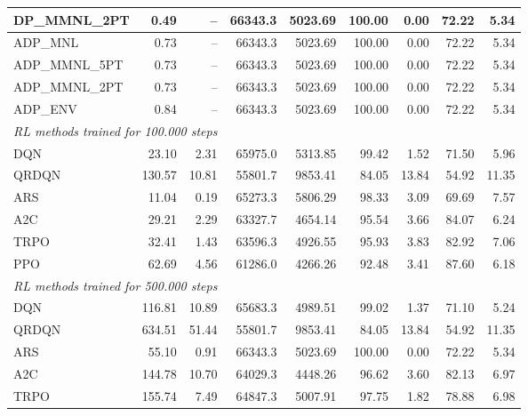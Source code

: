 \begin{samepage}
\begin{center}
\begin{tabular}{l|rr|rr|rr|rr}
    DP\_MMNL\_2PT &     0.49 &    -- &    66343.3 &    5023.69 &  100.00 &    0.00 &   72.22 &    5.34 \\
    \midrule
    ADP\_MNL     &     0.73 &    -- &    66343.3 &    5023.69 &  100.00 &    0.00 &   72.22 &    5.34 \\
    ADP\_MMNL\_5PT &     0.73 &    -- &    66343.3 &    5023.69 &  100.00 &    0.00 &   72.22 &    5.34 \\
    ADP\_MMNL\_2PT &     0.73 &    -- &    66343.3 &    5023.69 &  100.00 &    0.00 &   72.22 &    5.34 \\
    ADP\_ENV     &     0.84 &    -- &    66343.3 &    5023.69 &  100.00 &    0.00 &   72.22 &    5.34 \\
    \midrule
    \multicolumn{9}{l}{\textit{RL methods trained for 100.000 steps}} \\
    \midrule
    DQN          &    23.10 &     2.31 &    65975.0 &    5313.85 &   99.42 &    1.52 &   71.50 &    5.96 \\
    QRDQN        &   130.57 &    10.81 &    55801.7 &    9853.41 &   84.05 &   13.84 &   54.92 &   11.35 \\
    ARS          &    11.04 &     0.19 &    65273.3 &    5806.29 &   98.33 &    3.09 &   69.69 &    7.57 \\
    A2C          &    29.21 &     2.29 &    63327.7 &    4654.14 &   95.54 &    3.66 &   84.07 &    6.24 \\
    TRPO         &    32.41 &     1.43 &    63596.3 &    4926.55 &   95.93 &    3.83 &   82.92 &    7.06 \\
    PPO          &    62.69 &     4.56 &    61286.0 &    4266.26 &   92.48 &    3.41 &   87.60 &    6.18 \\
    \midrule
    \multicolumn{9}{l}{\textit{RL methods trained for 500.000 steps}} \\
    \midrule
    DQN          &   116.81 &    10.89 &    65683.3 &    4989.51 &   99.02 &    1.37 &   71.10 &    5.24 \\
    QRDQN        &   634.51 &    51.44 &    55801.7 &    9853.41 &   84.05 &   13.84 &   54.92 &   11.35 \\
    ARS          &    55.10 &     0.91 &    66343.3 &    5023.69 &  100.00 &    0.00 &   72.22 &    5.34 \\
    A2C          &   144.78 &    10.70 &    64029.3 &    4448.26 &   96.62 &    3.60 &   82.13 &    6.97 \\
    TRPO         &   155.74 &     7.49 &    64847.3 &    5007.91 &   97.75 &    1.82 &   78.88 &    6.98 \\

\end{tabular}
\end{center}
\end{samepage}
